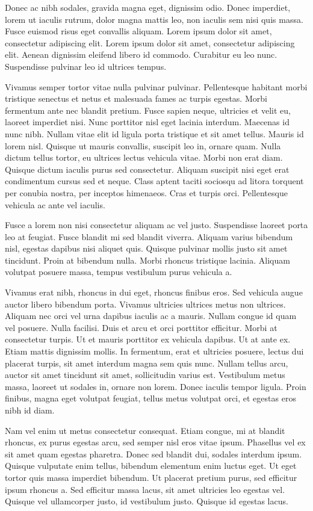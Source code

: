 \documentclass[a4paper,10pt,twoside]{article} %
\begin{document}
Donec ac nibh sodales, gravida magna eget, dignissim odio.
Donec imperdiet, lorem ut iaculis rutrum, dolor magna mattis leo, non iaculis sem nisi quis massa.
Fusce euismod risus eget convallis aliquam.
Lorem ipsum dolor sit amet, consectetur adipiscing elit.
Lorem ipsum dolor sit amet, consectetur adipiscing elit.
Aenean dignissim eleifend libero id commodo.
Curabitur eu leo nunc.
Suspendisse pulvinar leo id ultrices tempus.

Vivamus semper tortor vitae nulla pulvinar pulvinar.
Pellentesque habitant morbi tristique senectus et netus et malesuada fames ac turpis egestas.
Morbi fermentum ante nec blandit pretium.
Fusce sapien neque, ultricies et velit eu, laoreet imperdiet nisi.
Nunc porttitor nisl eget lacinia interdum.
Maecenas id nunc nibh.
Nullam vitae elit id ligula porta tristique et sit amet tellus.
Mauris id lorem nisl.
Quisque ut mauris convallis, suscipit leo in, ornare quam.
Nulla dictum tellus tortor, eu ultrices lectus vehicula vitae.
Morbi non erat diam.
Quisque dictum iaculis purus sed consectetur.
Aliquam suscipit nisi eget erat condimentum cursus sed et neque.
Class aptent taciti sociosqu ad litora torquent per conubia nostra, per inceptos himenaeos.
Cras et turpis orci.
Pellentesque vehicula ac ante vel iaculis.

Fusce a lorem non nisi consectetur aliquam ac vel justo.
Suspendisse laoreet porta leo at feugiat.
Fusce blandit mi sed blandit viverra.
Aliquam varius bibendum nisl, egestas dapibus nisi aliquet quis.
Quisque pulvinar mollis justo sit amet tincidunt.
Proin at bibendum nulla.
Morbi rhoncus tristique lacinia.
Aliquam volutpat posuere massa, tempus vestibulum purus vehicula a.

Vivamus erat nibh, rhoncus in dui eget, rhoncus finibus eros.
Sed vehicula augue auctor libero bibendum porta.
Vivamus ultricies ultrices metus non ultrices.
Aliquam nec orci vel urna dapibus iaculis ac a mauris.
Nullam congue id quam vel posuere.
Nulla facilisi.
Duis et arcu et orci porttitor efficitur.
Morbi at consectetur turpis.
Ut et mauris porttitor ex vehicula dapibus.
Ut at ante ex.
Etiam mattis dignissim mollis.
In fermentum, erat et ultricies posuere, lectus dui placerat turpis, sit amet interdum magna sem quis nunc.
Nullam tellus arcu, auctor sit amet tincidunt sit amet, sollicitudin varius est.
Vestibulum metus massa, laoreet ut sodales in, ornare non lorem.
Donec iaculis tempor ligula.
Proin finibus, magna eget volutpat feugiat, tellus metus volutpat orci, et egestas eros nibh id diam.

Nam vel enim ut metus consectetur consequat.
Etiam congue, mi at blandit rhoncus, ex purus egestas arcu, sed semper nisl eros vitae ipsum.
Phasellus vel ex sit amet quam egestas pharetra.
Donec sed blandit dui, sodales interdum ipsum.
Quisque vulputate enim tellus, bibendum elementum enim luctus eget.
Ut eget tortor quis massa imperdiet bibendum.
Ut placerat pretium purus, sed efficitur ipsum rhoncus a.
Sed efficitur massa lacus, sit amet ultricies leo egestas vel.
Quisque vel ullamcorper justo, id vestibulum justo.
Quisque id egestas lacus.
\end{document}
